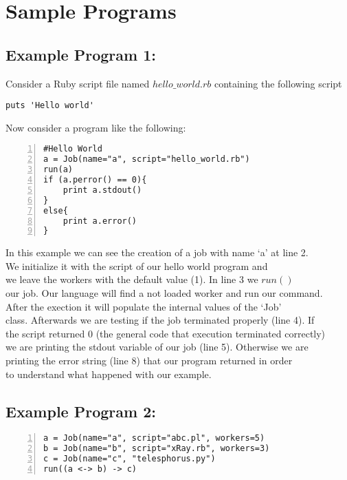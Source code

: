 \section{Sample Programs}
\label{sect:samples}
\subsection*{Example Program 1:}
Consider a Ruby script file named $hello\_world.rb$ containing the following script
\begin{verbatim}
puts 'Hello world'
\end{verbatim}
Now consider a \lang{} program like the following:
\begin{Verbatim}[numbers=left]
#Hello World
a = Job(name="a", script="hello_world.rb")
run(a)
if (a.perror() == 0){
    print a.stdout()
}
else{
    print a.error()
}
\end{Verbatim}

In this example we can see the creation of a job with name `a' at line 2.\\
We initialize it with the script of our hello world program and\\
we leave the workers with the default value (1). In line 3 we $run()$\\
our job. Our language will find a not loaded worker and run our command.\\
After the exection it will populate the internal values of the `Job'\\
class. Afterwards we are testing if the job terminated properly (line 4). If\\
the script returned 0 (the general code that execution terminated correctly)\\
we are printing the stdout variable of our job (line 5). Otherwise we are\\
printing the error string (line 8) that our program returned in order\\
to understand what happened with our example.\\

\subsection*{Example Program 2:}
\begin{Verbatim}[numbers=left]
a = Job(name="a", script="abc.pl", workers=5)
b = Job(name="b", script="xRay.rb", workers=3)
c = Job(name="c", "telesphorus.py")
run((a <-> b) -> c)
\end{Verbatim}

